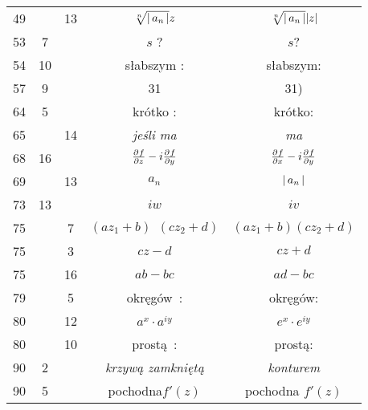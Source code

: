 \documentclass[a4paper,11pt]{article}
\begin{document}
\begin{center}
\begin{tabular}{|c|c|c|c|c|}
    49  & & 13 & $\sqrt[n]{ \left| \,  a_{ n }  \, \right| } z$
           & $\sqrt[n]{ \left| \,  a_{ n }  \, \right| } | z |$ \\
    53  &  7 & & $s$ ? & $s$? \\
    54  & 10 & & słabszym : & słabszym: \\
    57  &  9 & & 31 & 31) \\
    64  &  5 & & krótko : & krótko: \\
    65  & & 14 & \emph{jeśli ma} & \emph{ma} \\
    68  & 16 & & $\frac{ \partial^{  } {  f  } }{ \partial {  z  }^{  } } - i \frac{ \partial^{  } {  f  } }{ \partial {  y  }^{  } }$
           & $\frac{ \partial^{  } {  f  } }{ \partial {  x  }^{  } } - i \frac{ \partial^{  } {  f  } }{ \partial {  y  }^{  } }$ \\
    69  & & 13 & $a_{ n }$ & $\left| \,  a_{ n }  \, \right|$ \\
    73  & 13 & & $iw$ & $iv$ \\
    75  & &  7 & $( a z_{ 1 } + b )\;\, ( c z_{ 2 } + d )$
           & $( a z_{ 1 } + b ) ( c z_{ 2 } + d )$ \\
    75  & &  3 & $c z - d$ & $c z + d$ \\
    75  & & 16 & $ab - bc$ & $ad - bc$ \\
    79  & &  5 & okręgów~: & okręgów: \\
    80  & & 12 & $a^{ x } \cdot a^{ iy }$ & $e^{ x } \cdot e^{ iy }$ \\
    80  & & 10 & prostą~: & prostą: \\
    90  &  2 & & \emph{krzywą zamkniętą} & \emph{konturem} \\
    90  &  5 & & pochodna$f'( z )$ & pochodna $f'( z )$ \\
    \hline
  \end{tabular}


\end{center}
\end{document}
